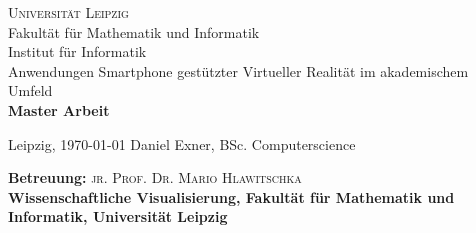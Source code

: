 \begin{titlepage}
\begin{center}
\vspace*{1cm}
{\LARGE \textsc{Universit\"at Leipzig}}\\
{\large Fakult\"at f\"ur Mathematik und Informatik\\
 Institut für Informatik\\[3.3cm]}
{\huge Anwendungen Smartphone gestützter Virtueller Realität im akademischem
Umfeld\\[2cm]}
{\Large\bf  Master Arbeit\\[1.5cm]}
\end{center}
\begin{flushleft}
\large Leipzig, \today \hfill
\vspace{-0.5cm}
Daniel Exner, BSc. Computerscience
\end{flushleft}
\vspace{0.2cm}
\begin{flushleft}
\footnotesize \textbf{Betreuung:} \textsc{jr. Prof. Dr. Mario Hlawitschka}\\
\textbf{Wissenschaftliche Visualisierung, Fakult\"at f\"ur Mathematik und Informatik, Universit\"at Leipzig}
\end{flushleft}
\end{titlepage}
